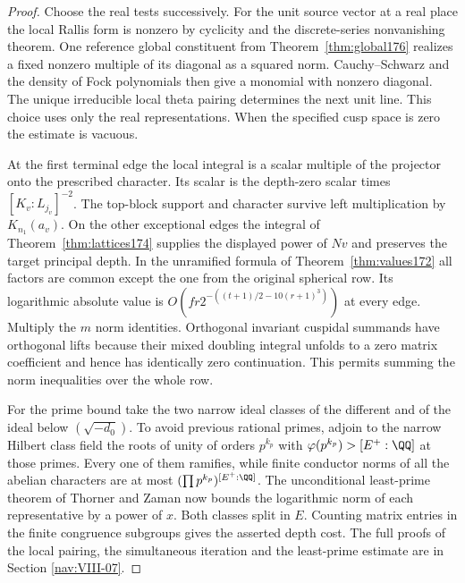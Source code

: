 \documentclass[a4paper,11pt]{article}
\theoremstyle{definition}
\theoremstyle{remark}
\numberwithin{equation}{section}
\begin{document}
\begin{proof}
Choose the real tests successively. For the unit source
vector at a real place the local Rallis form is nonzero
by cyclicity and the discrete-series nonvanishing theorem.
One reference global constituent from
Theorem~\ref{thm:global176} realizes a fixed nonzero
multiple of its diagonal as a squared norm. Cauchy--Schwarz and the density of Fock
polynomials then give a monomial with nonzero diagonal.
The unique irreducible local theta pairing determines the
next unit line. This choice uses only the real representations.
When the specified cusp space is zero the estimate is vacuous.

At the first terminal edge the local integral is a scalar
multiple of the projector onto the prescribed character.
Its scalar is the depth-zero scalar times \([K_v:L_{j_v}]^{-2}\).
The top-block support and character survive left multiplication
by \(K_{n_1}(a_v)\). On the other exceptional edges the
integral of Theorem~\ref{thm:lattices174} supplies the
displayed power of \(Nv\) and preserves the target principal
depth. In the unramified formula of Theorem~\ref{thm:values172}
all factors are common except the one from the original
spherical row. Its logarithmic absolute value is
\(O(fr2^{-((t+1)/2-10(r+1)^3)})\) at every edge. Multiply the
\(m\) norm identities. Orthogonal invariant cuspidal summands
have orthogonal lifts because their mixed doubling integral
unfolds to a zero matrix coefficient and hence has identically
zero continuation. This permits summing the norm inequalities
over the whole row.

For the prime bound take the two narrow ideal classes of the
different and of the ideal below \((\sqrt{-d_0})\). To avoid
previous rational primes, adjoin to the narrow Hilbert class
field the roots of unity of orders \(p^{k_p}\) with
\(\varphi(p^{k_p})>[E^+:\QQ]\) at those primes. Every one
of them ramifies, while finite conductor norms of all the
abelian characters are at most \((\prod p^{k_p})^{[E^+:\QQ]}\).
The unconditional least-prime theorem of Thorner and Zaman
now bounds the logarithmic norm of each representative by
a power of \(x\). Both classes split in \(E\). Counting matrix
entries in the finite congruence subgroups gives the asserted
depth cost. The full proofs of the local pairing, the
simultaneous iteration and the least-prime estimate are in
Section \ref{nav:VIII-07}.
\end{proof}
\end{document}
